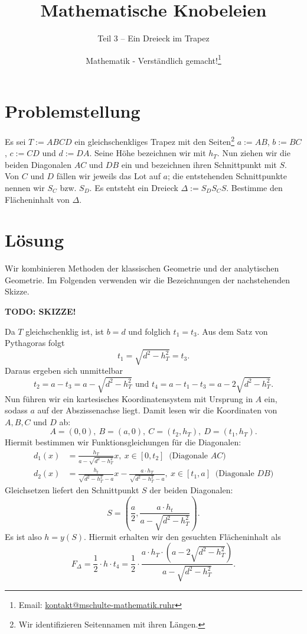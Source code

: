 \documentclass[]{scrartcl}
\title{Mathematische Knobeleien}
\subtitle{Teil 3 -- Ein Dreieck im Trapez}
\author{Mathematik - Verständlich gemacht!\footnote{Email: \href{mailto:kontakt@mschulte-mathematik.ruhr}{kontakt@mschulte-mathematik.ruhr}}}
\begin{document}
\maketitle

\section*{Problemstellung}
Es sei $T:=ABCD$ ein gleichschenkliges Trapez mit den 
Seiten\footnote{Wir identifizieren Seitennamen mit ihren 
Längen.} $a:=AB$, $b:=BC$, $c:=CD$ und $d:=DA$. Seine Höhe
bezeichnen wir mit $h_T$. Nun ziehen wir die
beiden Diagonalen $AC$ und $DB$ ein und bezeichnen ihren 
Schnittpunkt mit $S$. Von $C$ und $D$ fällen wir jeweils das
Lot auf $a$; die entstehenden Schnittpunkte nennen wir $S_C$ bzw.
$S_D$. Es entsteht ein Dreieck $\Delta := S_DS_CS$. 
Bestimme den Flächeninhalt von $\Delta$.

\section*{Lösung}
Wir kombinieren Methoden der klassischen Geometrie und der 
analytischen Geometrie. Im Folgenden verwenden wir die 
Bezeichnungen der nachstehenden Skizze.

\noindent 
\textbf{TODO: SKIZZE!}

\noindent 
Da $T$ gleichschenklig ist, ist $b=d$ und folglich $t_1=t_3$.
Aus dem Satz von Pythagoras folgt 
$$
t_1 = \sqrt{d^2-h_T^2} = t_3.
$$
Daraus ergeben sich unmittelbar
$$
t_2 = a-t_3 = a-\sqrt{d^2-h_T^2} \text{ und } 
t_4 = a-t_1-t_3 = a-2\sqrt{d^2-h_T^2}.
$$
Nun führen wir ein kartesisches Koordinatensystem mit Ursprung in
$A$ ein, sodass $a$ auf der Abszissenachse liegt. Damit lesen wir
die Koordinaten von $A,B,C$ und $D$ ab:
$$
A = (0,0), ~ B = (a,0), ~ C = (t_2,h_T), ~ D = (t_1,h_T).
$$
Hiermit bestimmen wir Funktionsgleichungen für die Diagonalen:
\begin{align*}
d_1(x) &= \frac{h_T}{a-\sqrt{d^2-h_T^2}}x, ~ x \in [0,t_2] ~
\text{ (Diagonale $AC$)}
\\
d_2(x) &= \frac{h_t}{\sqrt{d^2-h_T^2} - a}x - \frac{a\cdot h_T}
{\sqrt{d^2-h_T^2}-a}, ~ x \in [t_1,a] ~ \text{ (Diagonale $DB$)}
\end{align*}
Gleichsetzen liefert den Schnittpunkt $S$ der beiden Diagonalen:
$$
S = \left ( \frac{a}{2}, \frac{a \cdot h_t}{a-\sqrt{d^2-h_T^2}}
 \right ).
$$
Es ist also $h = y(S)$. Hiermit erhalten wir den gesuchten 
Flächeninhalt als
$$
F_\Delta = \frac{1}{2} \cdot h \cdot t_4 =
\frac{1}{2} \cdot \frac{a \cdot h_T \cdot \left ( 
	a - 2\sqrt{d^2-h_T^2} \right )}{a- \sqrt{d^2-h_T^2}}.
$$
\end{document}
